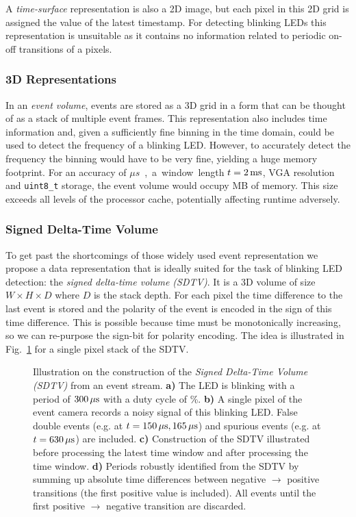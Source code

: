 A \emph{time-surface} representation is also a 2D image, but each pixel in this 2D grid is assigned the value of the latest timestamp. For detecting blinking LEDs this representation is unsuitable as it contains no information related to periodic on-off transitions of a pixels.

\subsubsection*{3D Representations}
In an \emph{event volume}, events are stored as a 3D grid in a form that can be thought of as a stack of multiple event frames. This representation also includes time information and, given a sufficiently fine binning in the time domain, could be used to detect the frequency of a blinking LED. However, to accurately detect the frequency the binning would have to be very fine, yielding a huge memory footprint. For an accuracy of \unit[5]{$\mu s$}, a window length $t = \unit[2]{ms}$, VGA resolution and \texttt{uint8\_t} storage, the event volume would occupy \unit[117]{MB} of memory. This size exceeds all levels of the processor cache, potentially affecting runtime adversely.

\subsubsection*{Signed Delta-Time Volume}
To get past the shortcomings of those widely used event representation we propose a data representation that is ideally suited for the task of blinking LED detection: the \emph{signed delta-time volume (SDTV)}. It is a 3D volume of size {$W \times H \times D$} where $D$ is the stack depth. For each pixel the time difference to the last event is stored and the polarity of the event is encoded in the sign of this time difference. This is possible because time must be monotonically increasing, so we can re-purpose the sign-bit for polarity encoding. The idea is illustrated in Fig.~\ref{fig:sdtv} for a single pixel stack of the SDTV.
\begin{figure}
    \centering
    
    \vspace*{-18pt}
    \caption{Illustration on the construction of the \emph{Signed Delta-Time Volume (SDTV)} from an event stream. \textbf{a)} The LED is blinking with a period of $\unit[300]{\mu s}$ with a duty cycle of \unit[10]{\%}. \textbf{b)} A single pixel of the event camera records a noisy signal of this blinking LED. False double events (e.g. at $t = \unit[150]{\mu s}, \unit[165]{\mu s}$) and spurious events (e.g. at $t = \unit[630]{\mu s}$) are included. \textbf{c)} Construction of the SDTV illustrated before processing the latest time window and after processing the time window. \textbf{d)} Periods robustly identified from the SDTV by summing up absolute time differences between negative $\rightarrow$ positive transitions (the first positive value is included). All events until the first positive $\rightarrow$ negative transition are discarded.}
    \label{fig:sdtv}
\end{figure}

